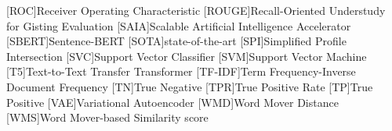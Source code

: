 \begin{acronym}[XXXXXXXXX]
    [ROC]{Receiver Operating Characteristic}
    [ROUGE]{Recall-Oriented Understudy for Gisting Evaluation}
    [SAIA]{Scalable Artificial Intelligence Accelerator}
    [SBERT]{Sentence-BERT}
    [SOTA]{state-of-the-art}
    [SPI]{Simplified Profile Intersection}
    [SVC]{Support Vector Classifier}
    [SVM]{Support Vector Machine}
    [T5]{Text-to-Text Transfer Transformer}
    [TF-IDF]{Term Frequency-Inverse Document Frequency}
    [TN]{True Negative}
    [TPR]{True Positive Rate}
    [TP]{True Positive}
    [VAE]{Variational Autoencoder}
    [WMD]{Word Mover Distance}
    [WMS]{Word Mover-based Similarity score}
\end{acronym}
